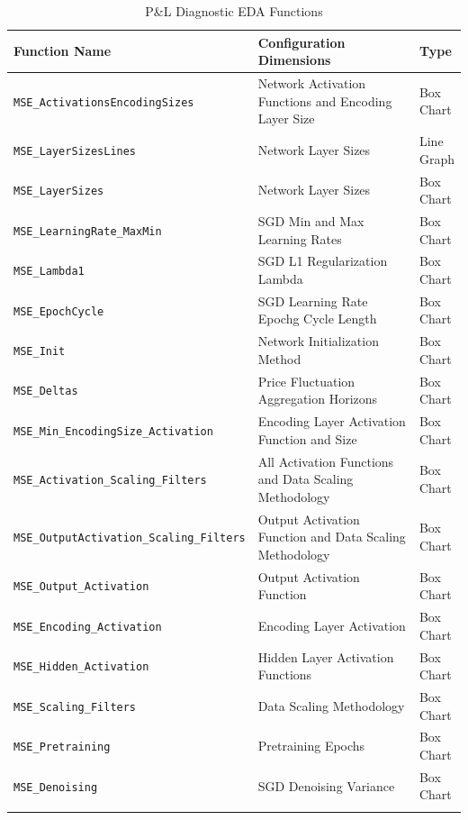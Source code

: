 \documentclass[a4paper,11pt,oneside]{article}
\theoremstyle{plain}
\theoremstyle{definition}
\begin{document}
	\begin{longtable}{|p{0.5\linewidth}|p{0.4\linewidth}|p{0.1\linewidth}|}
		\hline
		\textbf{Function Name} &\textbf{Configuration Dimensions}&\textbf{Type}  \\\hline	
		\texttt{MSE\_ActivationsEncodingSizes} & {Network Activation Functions and Encoding Layer Size}& {Box Chart} \\\hline
		\texttt{MSE\_LayerSizesLines} & {Network Layer Sizes}& {Line Graph} \\\hline
		\texttt{MSE\_LayerSizes} & {Network Layer Sizes}& {Box Chart} \\\hline
		\texttt{MSE\_LearningRate\_MaxMin} & {SGD Min and Max Learning Rates}& {Box Chart} \\\hline
		\texttt{MSE\_Lambda1} & {SGD L1 Regularization Lambda}& {Box Chart} \\\hline
		\texttt{MSE\_EpochCycle} & {SGD Learning Rate Epochg Cycle Length}& {Box Chart} \\\hline
		\texttt{MSE\_Init} & {Network Initialization Method}& {Box Chart} \\\hline
		\texttt{MSE\_Deltas} & {Price Fluctuation Aggregation Horizons}& {Box Chart} \\\hline
		\texttt{MSE\_Min\_EncodingSize\_Activation} & {Encoding Layer Activation Function and Size}& {Box Chart} \\\hline
		\texttt{MSE\_Activation\_Scaling\_Filters} & {All Activation Functions and Data Scaling Methodology}& {Box Chart} \\\hline
		\texttt{MSE\_OutputActivation\_Scaling\_Filters} & {Output Activation Function and Data Scaling Methodology}& {Box Chart} \\\hline
		\texttt{MSE\_Output\_Activation} & {Output Activation Function}& {Box Chart} \\\hline
		\texttt{MSE\_Encoding\_Activation} & {Encoding Layer Activation}& {Box Chart} \\\hline
		\texttt{MSE\_Hidden\_Activation} & {Hidden Layer Activation Functions}& {Box Chart} \\\hline
		\texttt{MSE\_Scaling\_Filters} & {Data Scaling Methodology}& {Box Chart} \\\hline
		\texttt{MSE\_Pretraining} & {Pretraining Epochs}& {Box Chart} \\\hline
		\texttt{MSE\_Denoising} & {SGD Denoising Variance}& {Box Chart} \\\hline
		
		\caption{P\&L Diagnostic EDA Functions}
		\label{tab_diagnostics_mse}
	\end{longtable}
	
	
	
	\newpage
	
	
	
	
	
	
	
	
\end{document}
